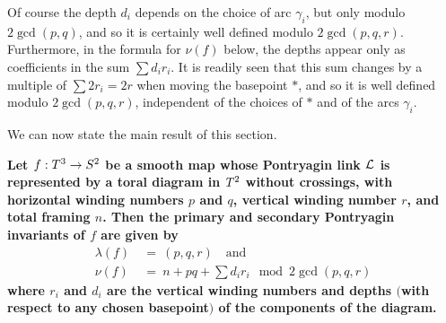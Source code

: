 Of course the depth $d_i$ depends on the choice of arc $\gamma_i$, but only modulo $2\gcd(p,q)$, and so it is certainly well defined modulo $2\gcd(p,q,r)$.  Furthermore, in the formula for $\nu(f)$ below, the depths appear only as coefficients in the sum $\sum d_ir_i$.  It is readily seen that this sum changes by a multiple of $\sum 2r_i = 2r$ when moving the basepoint $*$, and so it is well defined modulo $2\gcd(p,q,r)$, independent of the choices of $*$ and of the arcs $\gamma_i$. 

We can now state the main result of this section.    

\begin{proposition}
\label{prop:pontryagin}
\textbf{\boldmath Let $f:T^3\to S^2$ be a smooth map whose Pontryagin link $\mathcal L$ is represented by a toral diagram in $T^2$ without crossings, with horizontal winding numbers $p$ and $q$, vertical winding number $r$, and total framing $n$.  Then the primary and secondary Pontryagin invariants of $f$ are given by
$$
\begin{aligned}
\lambda(f) \ &= \ (p,q,r) \quad\text{and} \\
\nu(f) \ &= \ n + pq + \textstyle\sum d_ir_i \mod{2\gcd(p,q,r)}
\end{aligned}
$$
where $r_i$ and $d_i$ are the vertical winding numbers and depths $($with respect to any chosen basepoint$)$ of the components of the diagram.}
\end{proposition}

